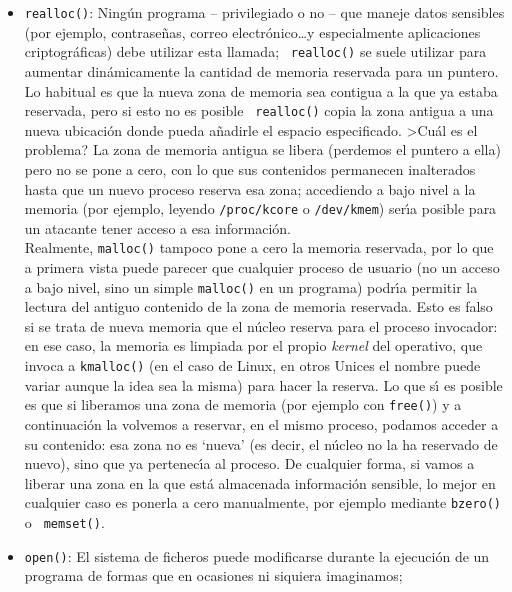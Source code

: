 \begin{itemize}
de esta funci\'on de librer\'{\i}a que compruebe la longitud de
sus argumentos; si no lo hacemos y esa longitud sobrepasa un cierto 
l\'{\i}mite (generalmente, 1024 {\it bytes}) podemos causar un desbordamiento en
los {\it buffers} de nuestro sistema de {\it log}, dej\'andolo inutilizable.
\item {\tt realloc()}: Ning\'un programa -- privilegiado o no -- que maneje 
datos sensibles (por ejemplo, contrase\~nas, correo electr\'onico\ldots y
especialmente aplicaciones criptogr\'aficas) debe utilizar esta llamada; {\tt
realloc()} se suele utilizar para aumentar din\'amicamente la cantidad de 
memoria reservada para un puntero. Lo habitual es que la nueva zona de memoria 
sea contigua a la que ya estaba reservada, pero si esto no es posible {\tt
realloc()} copia la zona antigua a una nueva ubicaci\'on donde pueda a\~nadirle
el espacio especificado. >Cu\'al es el problema? La zona de memoria antigua se 
libera (perdemos el puntero a ella) pero no se pone a cero, con lo que sus
contenidos permanecen inalterados hasta que un nuevo proceso reserva esa zona; 
accediendo a bajo nivel a la memoria (por ejemplo, leyendo {\tt /proc/kcore} o 
{\tt /dev/kmem}) ser\'{\i}a posible para un atacante tener acceso a esa 
informaci\'on.\\
Realmente, {\tt malloc()} tampoco pone a cero la memoria reservada, por lo que a
primera vista puede parecer que cualquier proceso de usuario (no un acceso a 
bajo nivel, sino un simple {\tt malloc()} en un programa) podr\'{\i}a permitir
la lectura del antiguo contenido de la zona de memoria reservada. Esto es falso
si se trata de nueva memoria que el n\'ucleo reserva para el proceso invocador:
en ese caso, la memoria es limpiada por el propio {\it kernel} del operativo,
que invoca a {\tt kmalloc()} (en el caso de Linux, en otros Unices el nombre
puede variar aunque la idea sea la misma) para hacer la reserva. Lo que s\'{\i} 
es posible es que si 
liberamos una zona de memoria (por ejemplo con {\tt free()}) y a continuaci\'on
la volvemos a reservar, en el mismo proceso, podamos acceder a su contenido: esa
zona no es `nueva' (es decir, el n\'ucleo no la ha reservado de nuevo), sino 
que ya pertenec\'{\i}a al proceso. De cualquier forma, si vamos a liberar una
zona en la que est\'a almacenada informaci\'on sensible, lo mejor en cualquier
caso es ponerla a cero manualmente, por ejemplo mediante {\tt bzero()} o {\tt
memset()}.
\item {\tt open()}: El sistema de ficheros puede modificarse durante la 
ejecuci\'on de un programa de formas que en ocasiones ni siquiera imaginamos;

\end{itemize}
